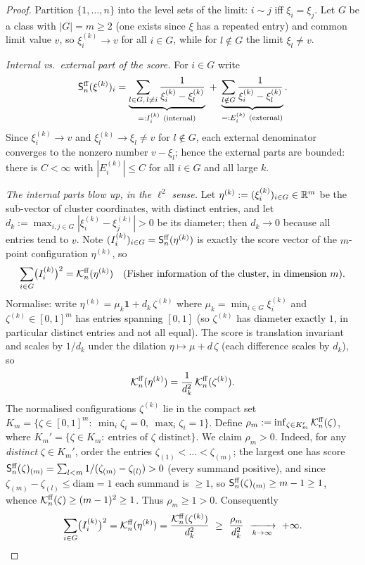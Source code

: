 \begin{proof}
Partition $\{1,\dots,n\}$ into the level sets of the limit: $i\sim j$ iff
$\xi_i=\xi_j$. Let $G$ be a class with $|G|=m\ge 2$ (one exists since $\xi$ has a
repeated entry) and common limit value $v$, so $\xi^{(k)}_i\to v$ for all $i\in G$,
while for $l\notin G$ the limit $\xi_l\ne v$.

\smallskip\noindent\emph{Internal vs.\ external part of the score.}
For $i\in G$ write
\[
\qfourScore(\xi^{(k)})_i
=\underbrace{\sum_{l\in G,\,l\ne i}\frac1{\xi^{(k)}_i-\xi^{(k)}_l}}_{=:I^{(k)}_i\ \text{(internal)}}
\;+\;
\underbrace{\sum_{l\notin G}\frac1{\xi^{(k)}_i-\xi^{(k)}_l}}_{=:E^{(k)}_i\ \text{(external)}}.
\]
Since $\xi^{(k)}_i\to v$ and $\xi^{(k)}_l\to\xi_l\ne v$ for $l\notin G$, each
external denominator converges to the nonzero number $v-\xi_l$; hence the external
parts are bounded: there is $C<\infty$ with $|E^{(k)}_i|\le C$ for all $i\in G$ and
all large $k$.

\smallskip\noindent\emph{The internal parts blow up, in the $\ell^2$ sense.}
Let $\eta^{(k)}:=(\xi^{(k)}_i)_{i\in G}\in\mathbb{R}^m$ be the sub-vector of cluster
coordinates, with distinct entries, and let
$d_k:=\max_{i,j\in G}|\xi^{(k)}_i-\xi^{(k)}_j|>0$ be its diameter; then $d_k\to 0$
because all entries tend to $v$. Note $(I^{(k)}_i)_{i\in G}=\mathsf{S}^{\mathrm{ff}}_n(\eta^{(k)})$
is exactly the score vector of the $m$-point configuration $\eta^{(k)}$, so
\[
\sum_{i\in G}\bigl(I^{(k)}_i\bigr)^2=\mathcal{K}^{\mathrm{ff}}_n(\eta^{(k)})
\quad(\text{Fisher information of the cluster, in dimension }m).
\]
Normalise: write $\eta^{(k)}=\mu_k\mathbf 1+d_k\,\zeta^{(k)}$ where
$\mu_k=\min_{i\in G}\xi^{(k)}_i$ and $\zeta^{(k)}\in[0,1]^m$ has entries spanning
$[0,1]$ (so $\zeta^{(k)}$ has diameter exactly $1$, in particular distinct entries
and not all equal). The score is translation invariant and scales by $1/d_k$ under
the dilation $\eta\mapsto\mu+d\,\zeta$ (each difference scales by $d_k$), so
\[
\mathcal{K}^{\mathrm{ff}}_n(\eta^{(k)})=\frac{1}{d_k^2}\,\mathcal{K}^{\mathrm{ff}}_n(\zeta^{(k)}).
\]
The normalised configurations $\zeta^{(k)}$ lie in the compact set
$K_m=\{\zeta\in[0,1]^m:\ \min_i\zeta_i=0,\ \max_i\zeta_i=1\}$. Define
$\rho_m:=\inf_{\zeta\in K_m'}\mathcal{K}^{\mathrm{ff}}_n(\zeta)$, where
$K_m'=\{\zeta\in K_m:\ \text{entries of }\zeta\text{ distinct}\}$. We claim
$\rho_m>0$. Indeed, for any \emph{distinct} $\zeta\in K_m'$, order the entries
$\zeta_{(1)}<\dots<\zeta_{(m)}$; the largest one has score
$\mathsf{S}^{\mathrm{ff}}_n(\zeta)_{(m)}=\sum_{l<m}1/(\zeta_{(m)}-\zeta_{(l)})>0$ (every summand
positive), and since $\zeta_{(m)}-\zeta_{(l)}\le\mathrm{diam}=1$ each summand is
$\ge 1$, so $\mathsf{S}^{\mathrm{ff}}_n(\zeta)_{(m)}\ge m-1\ge 1$, whence
$\mathcal{K}^{\mathrm{ff}}_n(\zeta)\ge(m-1)^2\ge 1$. Thus $\rho_m\ge 1>0$. Consequently
\[
\sum_{i\in G}\bigl(I^{(k)}_i\bigr)^2=\mathcal{K}^{\mathrm{ff}}_n(\eta^{(k)})
=\frac{\mathcal{K}^{\mathrm{ff}}_n(\zeta^{(k)})}{d_k^2}\ \ge\ \frac{\rho_m}{d_k^2}
\ \xrightarrow[k\to\infty]{}\ +\infty .
\]


\end{proof}
